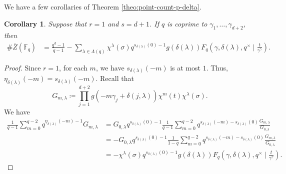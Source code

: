 \documentclass[11pt, reqno]{amsart}
\theoremstyle{plain}
\newtheorem{corol}[theo]{Corollary}
\theoremstyle{definition}
\newcommand{\F}{\mathbb{F}}
\newcommand{\ga}{\gamma}
\begin{document}
We have a few corollaries of Theorem \ref{theo:point-count-p-delta}.
\begin{corol}\label{cor:simplices-hg}
    Suppose that $r=1$ and $s={d+1}$.
    If $q$ is coprime to $\ga_1,\dots,\ga_{d+2}$, then
  \begin{align*}
      \#\overline{Z}(\F_q)&= \frac{q^{d}-1}{q-1}-\sum_{\lambda \in \Lambda(q)} \chi^{\lambda}(\sigma) q^{s_{\delta(\lambda)}(0)-1} g(\delta(\lambda))  F_q\left(\gamma,\delta(\lambda),q^\times \mid \frac{t}{\gamma^\gamma}\right).
  \end{align*}
\end{corol}
\begin{proof}
Since $r=1$, for each $m$, we have $s_{\delta(\lambda)}(-m)$ is at most $1$. Thus, $\eta_{\delta(\lambda)}(-m)= s_{\delta(\lambda)}(-m)$. 
Recall that 
\[
 G_{m,\lambda}\coloneqq \prod_{j=1}^{d+2}g\left(-m\gamma_j + \delta(j,\lambda)\right) \chi^{m}(t) \chi^{\lambda}(\sigma).
\]
We have
\begin{align*}
     \frac{1}{q-1}\sum_{m=0}^{q-2}q^{\eta_{\delta(\lambda)}(-m)-1} G_{m, \lambda} &= G_{0,\lambda} q^{s_{\delta(\lambda)}(0)-1} \frac{1}{q-1}\sum_{m=0}^{q-2}q^{s_{\delta(\lambda)}(-m)-s_{\delta(\lambda)}(0)} \frac{G_{m, \lambda}}{G_{0,\lambda}}\\
   &= - G_{0,\lambda} q^{s_{\delta(\lambda)}(0)-1} \frac{1}{1-q}\sum_{m=0}^{q-2}q^{s_{\delta(\lambda)}(-m)-s_{\delta(\lambda)}(0)} \frac{G_{m, \lambda}}{G_{0,\lambda}}\\
   &= - \chi^{\lambda}(\sigma) q^{s_{\delta(\lambda)}(0)-1} g(\delta(\lambda)) F_q\left(\gamma,\delta(\lambda),q^\times \mid \frac{t}{\gamma^\gamma}\right).
\end{align*}
\end{proof}
\end{document}
